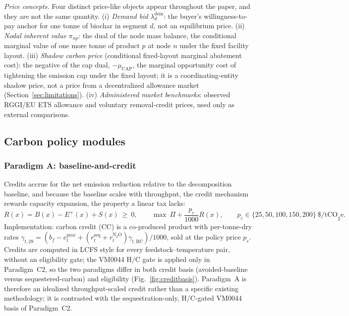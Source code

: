 \emph{Price concepts.} Four distinct price-like objects appear throughout the
paper, and they are not the same quantity. (i) \emph{Demand bid}
$\lambda^{\mathrm{dem}}_d$: the buyer's willingness-to-pay anchor for one tonne
of biochar in segment $d$, not an equilibrium price. (ii) \emph{Nodal inherent
value} $\pi_{np}$: the dual of the node mass balance, the conditional marginal
value of one more tonne of product $p$ at node $n$ under the fixed facility
layout. (iii) \emph{Shadow carbon price} (conditional fixed-layout marginal
abatement cost): the negative of the cap dual, $-\mu_{\mathrm{CAP}}$, the
marginal opportunity cost of tightening the emission cap under the fixed
layout; it is a coordinating-entity shadow price, not a price from a
decentralized allowance market (Section~\ref{sec:limitations}).
(iv) \emph{Administered market benchmarks}: observed RGGI/EU ETS allowance and
voluntary removal-credit prices, used only as external comparisons.

\subsection{Carbon policy modules}
\label{sec:policy}

\subsubsection{Paradigm A: baseline-and-credit}

Credits accrue for the net emission reduction relative to the decomposition
baseline, and because the baseline scales with throughput, the credit mechanism
rewards capacity expansion, the property a linear tax lacks:
\begin{equation}
R(x)=B(x)-E^{+}(x)+S(x)\ \ge\ 0,
\qquad \max\ \Pi+\frac{p_c}{1000}R(x),
\qquad p_c\in\{25,50,100,150,200\}\ \mathrm{\$/tCO}_2\mathrm{e}.
\end{equation}
Implementation: carbon credit (CC) is a co-produced product with per-tonne-dry
rates $\gamma_{t,28}=(b_f-e^{\mathrm{proc}}_{t}+(r^{\mathrm{seq}}_t+r^{\mathrm{N}_2\mathrm{O}}_t)\gamma_{t,\mathrm{BC}})/1000$,
sold at the policy price $p_c$. Credits are computed in LCFS style for
every feedstock--temperature pair, without an eligibility gate; the
VM0044 H/C gate is applied only in Paradigm~C2, so the two paradigms differ in
both credit basis (avoided-baseline versus sequestered-carbon) and eligibility
(Fig.~\ref{fig:creditbasis}). Paradigm~A is therefore an idealized
throughput-scaled credit rather than a specific existing methodology; it is
contrasted with the sequestration-only, H/C-gated VM0044 basis of Paradigm~C2.

